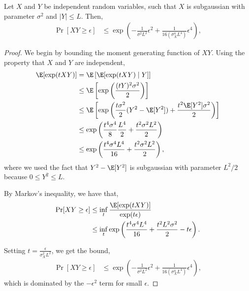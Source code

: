 \begin{lemma}
  \label{lemma:conc-prod}
  Let $X$ and $Y$ be independent random variables, such that $X$ is subgaussian with parameter $\sigma^2$ and $|Y| \le L$.
  Then, 
  \begin{align*}
    \Pr[ XY \ge \epsilon ] 
      &\le 
        \exp\left( - \frac{1}{\sigma^2 L^2} \epsilon^{2} 
          + \frac{1}{16 (\sigma^4_X L^4)} \epsilon^{4} \right),
  \end{align*}
\end{lemma}
\begin{proof}
  We begin by bounding the moment generating function of $XY$. Using the property that $X$ and $Y$ are independent,
  \begin{align*}
    \E[ \exp(t X Y) ] 
      &= \E\left[ \E[ \exp(t X Y) \mid Y ] \right] \\
      &\le \E\left[ \exp\left(\frac{(tY)^2 \sigma^2}{2}\right) \right] \\
      &\le \E\left[ \exp\left(\frac{t \sigma^2}{2} (Y^2 - \E[Y^2]) + \frac{t^2 \E[Y^2] \sigma^2}{2}\right) \right] \\
      &\le \exp\left(\frac{t^4 \sigma^4}{8} \frac{L^4}{2}  + \frac{t^2\sigma^2 L^2}{2}\right) \\
      &\le \exp\left(\frac{t^4 \sigma^4 L^4}{16}  + \frac{t^2 \sigma^2 L^2}{2}\right),
  \end{align*}
  where we used the fact that $Y^2 - \E[Y^2]$ is subgaussian with parameter $L^2/2$ because $0 \le Y^2 \le L$.

  By Markov's inequality, we have that,
  \begin{align*}
    \Pr[ XY \ge \epsilon ] 
      &\le \inf_t \frac{\E[\exp(t XY)]}{\exp(t\epsilon)} \\
      &\le \inf_t \exp\left(\frac{t^4 \sigma^4 L^4 }{16} + \frac{t^2 L^2 \sigma^2}{2} - t\epsilon\right).
  \end{align*}

  Setting $t = \frac{\epsilon}{\sigma^2_X L^2 }$, we get the bound,
  \begin{align*}
    \Pr[ XY \ge \epsilon ] 
      &\le 
        \exp\left( - \frac{1}{\sigma^2 L^2} \epsilon^{2} 
          + \frac{1}{16 (\sigma^4_X L^4)} \epsilon^{4} \right),
  \end{align*}
  which is dominated by the $-\epsilon^2$ term for small $\epsilon$.
\end{proof}


